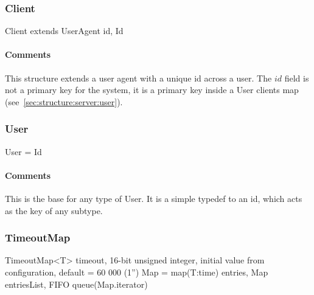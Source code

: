 \documentclass[a4paper,10pt]{article}
\begin{document}
\subsubsection{Client}

\begin{verbbox}
Client extends UserAgent
{
  id, Id
}
\end{verbbox}
\begin{center}
\theverbbox
\end{center}

\begin{inparaitem}[ ]
 \item \infrastructure
\end{inparaitem}

\paragraph*{Comments}
This structure extends a user agent with a unique id across a user. The $id$ field is not a primary key for the system, it is a primary key inside a User clients map 
(see~\ref{sec:structure:server:user}).

\subsubsection{User}

\begin{verbbox}
User = Id
\end{verbbox}
\begin{center}
\theverbbox
\end{center}

\begin{inparaitem}[ ]
 \item \infrastructure
\end{inparaitem}

\paragraph*{Comments}
This is the base for any type of User. It is a simple typedef to an id, which acts as the key of any subtype.

\subsubsection{TimeoutMap}

\begin{verbbox}
TimeoutMap<T>
{
  timeout, 16-bit unsigned integer,
    initial value from configuration, default = 60 000 (1'')
  Map = map(T:time)
  entries, Map
  entriesList, FIFO queue(Map.iterator)
}
\end{verbbox}
\begin{center}
\theverbbox
\end{center}
\end{document}
